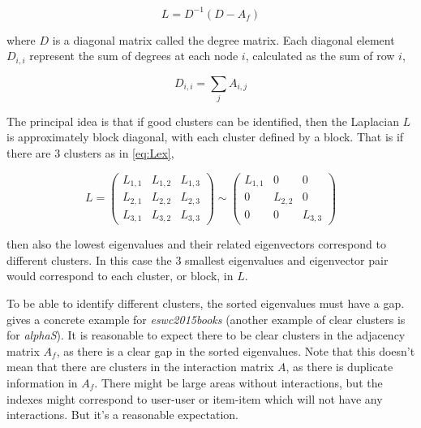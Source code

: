 \begin{equation}
    L = D^{-1}( D - A_f )
\end{equation}

where $D$ is a diagonal matrix called the degree matrix. Each diagonal element $D_{i, i}$ represent the sum of degrees at each node $i$, calculated as the sum of row $i$,

\begin{equation}
    D_{i, i} = \sum_j A_{i, j}
\end{equation}

The principal idea is that if good clusters can be identified, then the Laplacian $L$ is approximately block diagonal, with each cluster defined by a block. That is if there are 3 clusters as in \eqref{eq:Lex},

\begin{equation}\label{eq:Lex}
    L =
    \begin{pmatrix}
        L_{1, 1} & L_{1, 2} & L_{1, 3} \\
        L_{2, 1} & L_{2, 2} & L_{2, 3} \\
        L_{3, 1} & L_{3, 2} & L_{3, 3}
    \end{pmatrix}
    \sim
    \begin{pmatrix}
        L_{1, 1} & 0         & 0        \\
        0        & L_{2, 2}  & 0        \\
        0        & 0         & L_{3, 3}
    \end{pmatrix}
\end{equation}

then also the lowest eigenvalues and their related eigenvectors correspond to different clusters. In this case the 3 smallest eigenvalues and eigenvector pair would correspond to each cluster, or block, in $L$.

To be able to identify different clusters, the sorted eigenvalues must have a gap.  gives a concrete example for \textit{eswc2015books} (another example of clear clusters is  for \textit{alphaS}). It is reasonable to expect there to be clear clusters in the adjacency matrix $A_f$, as there is a clear gap in the sorted eigenvalues. Note that this doesn't mean that there are clusters in the interaction matrix $A$, as there is duplicate information in $A_f$. There might be large areas without interactions, but the indexes might correspond to user-user or item-item which will not have any interactions. But it's a reasonable expectation.

